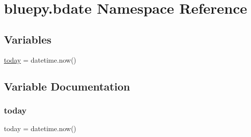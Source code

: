 \hypertarget{namespacebluepy_1_1bdate}{}\section{bluepy.\+bdate Namespace Reference}
\label{namespacebluepy_1_1bdate}
\subsection*{Variables}
\begin{DoxyCompactItemize}
\item 
\hyperlink{namespacebluepy_1_1bdate_ae4d2188a19ecb347e7b4fc50230732cb}{today} = datetime.\+now()
\end{DoxyCompactItemize}


\subsection{Variable Documentation}
\mbox{\label{namespacebluepy_1_1bdate_ae4d2188a19ecb347e7b4fc50230732cb}} 
\subsubsection{\texorpdfstring{today}{today}}
{\footnotesize\ttfamily today = datetime.\+now()}

